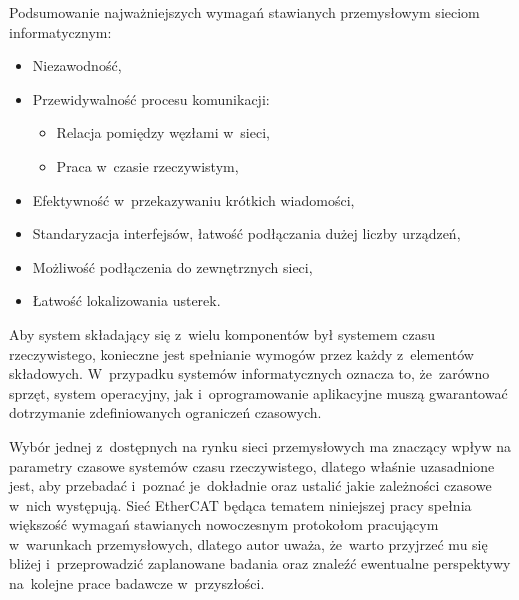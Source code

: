 Podsumowanie najważniejszych wymagań stawianych przemysłowym sieciom informatycznym:
\begin{itemize}
\item Niezawodność,
\item Przewidywalność procesu komunikacji:
\begin{itemize}
\item Relacja pomiędzy węzłami w~sieci,
\item Praca w~czasie rzeczywistym,
\end{itemize}
\item Efektywność w~przekazywaniu krótkich wiadomości,
\item Standaryzacja interfejsów, łatwość podłączania dużej liczby urządzeń,
\item Możliwość podłączenia do zewnętrznych sieci,
\item Łatwość lokalizowania usterek.
\end{itemize}

Aby system składający się z~wielu komponentów był systemem czasu rzeczywistego, konieczne jest spełnianie wymogów przez każdy z~elementów składowych. W~przypadku systemów informatycznych oznacza to, że~zarówno sprzęt, system operacyjny, jak i~oprogramowanie aplikacyjne muszą gwarantować dotrzymanie zdefiniowanych ograniczeń czasowych.

Wybór jednej z~dostępnych  na rynku sieci przemysłowych ma znaczący wpływ na parametry czasowe systemów czasu rzeczywistego, dlatego właśnie uzasadnione jest, aby przebadać i~poznać je~dokładnie oraz ustalić jakie zależności czasowe w~nich występują.
Sieć EtherCAT będąca tematem niniejszej pracy spełnia większość wymagań stawianych nowoczesnym protokołom pracującym w~warunkach przemysłowych, dlatego autor uważa, że~warto przyjrzeć mu się bliżej i~przeprowadzić zaplanowane badania oraz znaleźć ewentualne perspektywy na~kolejne prace badawcze w~przyszłości.
\clearpage
